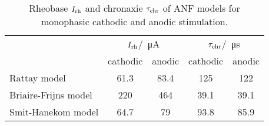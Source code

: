\begin{table}[h!]
\centering
\caption{Rheobase $I_{\text{rh}}$ and chronaxie $\tau_{\text{chr}}$ of ANF models for monophasic cathodic and anodic stimulation.}
\begin{tabular}{l|cc|cc}
& \multicolumn{2}{c|}{$I_{\text{rh}}$/\SI{}{\micro\ampere}} & \multicolumn{2}{c}{$\tau_{\text{chr}}$/\SI{}{\micro\second}}\\
& cathodic & anodic & cathodic & anodic\\\hline
Rattay model & 61.3 & 83.4 & 125 & 122\\
Briaire-Frijns model & 220 & 464 & 39.1 & 39.1\\
Smit-Hanekom model & 64.7 & 79 & 93.8 & 85.9\\
\end{tabular}
\label{tbl:strength_duration_comparison}
\end{table}